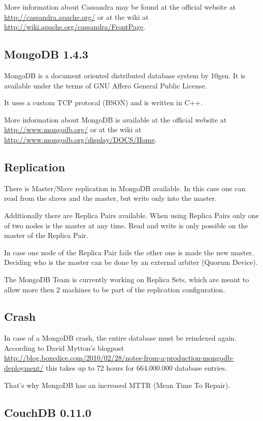 More information about Cassandra may be found at the official
website at \url{http://cassandra.apache.org/} or at the wiki at
\url{http://wiki.apache.org/cassandra/FrontPage}.

\subsection{MongoDB 1.4.3}

MongoDB is a document oriented distributed database system by
10gen. It is available under the terms of GNU Affero General Public
License.

It uses a custom TCP protocal (BSON) and is written in C++.

More information about MongoDB is available at the official website
at \url{http://www.mongodb.org/} or at the wiki at
\url{http://www.mongodb.org/display/DOCS/Home}.

\subsection{Replication}

There is Master/Slave replication in MongoDB available. In this
case one can read from the slaves and the master, but write only
into the master.

Additionally there are Replica Pairs available. When using Replica
Pairs only one of two nodes is the master at any time. Read and
write is only possible on the master of the Replica Pair.

In case one node of the Replica Pair fails the other one is made
the new master. Deciding who is the master can be done by an
external arbiter (Quorum Device).

The MongoDB Team is currently working on Replica Sets, which are
meant to allow more then 2 machines to be part of the replication
configuration.

\subsection{Crash}

In case of a MongoDB crash, the entire database must be reindexed
again. According to David Mytton's blogpost
\url{http://blog.boxedice.com/2010/02/28/notes-from-a-production-mongodb-deployment/}
this takes up to 72 hours for 664.000.000 database entries.

That's why MongoDB has an increased MTTR (Mean Time To Repair).

\subsection{CouchDB 0.11.0}

